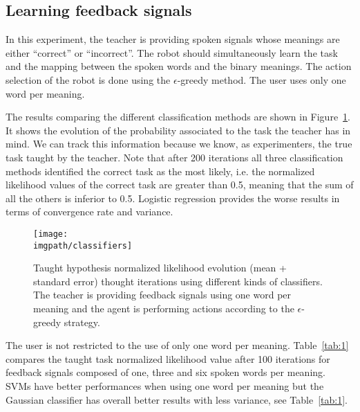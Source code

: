 
\subsection{Learning feedback signals}

In this experiment, the teacher is providing spoken signals whose meanings are either ``correct'' or ``incorrect''. The robot should simultaneously learn the task and the mapping between the spoken words and the binary meanings. The action selection of the robot is done using the $\epsilon$-greedy method. The user uses only one word per meaning.

The results comparing the different classification methods are shown in Figure~\ref{fig:FeedbackOneWord}. It shows the evolution of the probability associated to the task the teacher has in mind. We can track this information because we know, as experimenters, the true task taught by the teacher. Note that after 200 iterations all three classification methods identified the correct task as the most likely, i.e. the normalized likelihood values of the correct task are greater than 0.5, meaning that the sum of all the others is inferior to 0.5. Logistic regression provides the worse results in terms of convergence rate and variance.

\begin{figure}[!htbp]
  \centering
  \texttt{[image: \\imgpath/classifiers]}
  \caption{Taught hypothesis normalized likelihood evolution (mean + standard error) thought iterations using different kinds of classifiers. The teacher is providing feedback signals using one word per meaning and the agent is performing actions according to the $\epsilon$-greedy strategy.}
  \label{fig:FeedbackOneWord}
\end{figure}

The user is not restricted to the use of only one word per meaning. Table~\ref{tab:1} compares the taught task normalized likelihood value after 100 iterations for feedback signals composed of one, three and six spoken words per meaning. SVMs have better performances when using one word per meaning but the Gaussian classifier has overall better results with less variance, see Table~\ref{tab:1}.

